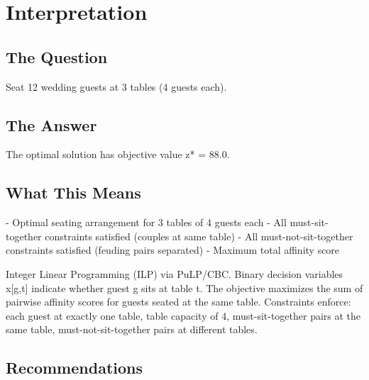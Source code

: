 \documentclass[11pt, a4paper]{article}
\begin{document}
\section{Interpretation}

\subsection{The Question}
Seat 12 wedding guests at 3 tables (4 guests each).

\subsection{The Answer}

\begin{polyainsight}[title={Bottom Line}]
The optimal solution has objective value z* = 88.0.
\end{polyainsight}

\subsection{What This Means}

- Optimal seating arrangement for 3 tables of 4 guests each
- All must-sit-together constraints satisfied (couples at same table)
- All must-not-sit-together constraints satisfied (feuding pairs separated)
- Maximum total affinity score

Integer Linear Programming (ILP) via PuLP/CBC. Binary decision variables x[g,t] indicate whether guest g sits at table t. The objective maximizes the sum of pairwise affinity scores for guests seated at the same table. Constraints enforce: each guest at exactly one table, table capacity of 4, must-sit-together pairs at the same table, must-not-sit-together pairs at different tables.



\subsection{Recommendations}
\end{document}
